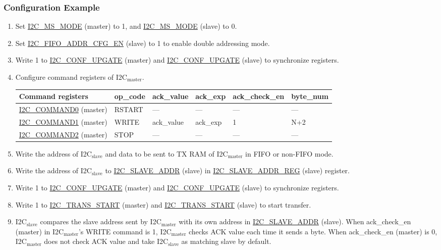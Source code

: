 \documentclass[main\_\_EN.tex]{subfiles}
\begin{document}
\subsubsection{Configuration Example}
\begin{enumerate}
\item Set \hyperref[fielddesc:I2CMSMODE]{I2C\_MS\_MODE} (master) to 1, and \hyperref[fielddesc:I2CMSMODE]{I2C\_MS\_MODE} (slave) to 0.
\item Set \hyperref[fielddesc:I2CFIFOADDRCFGEN]{I2C\_FIFO\_ADDR\_CFG\_EN} (slave) to 1 to enable double addressing mode.
\item Write 1 to \hyperref[fielddesc:I2CCONFUPGATE]{I2C\_CONF\_UPGATE} (master) and \hyperref[fielddesc:I2CCONFUPGATE]{I2C\_CONF\_UPGATE} (slave) to synchronize registers.
\item Configure command registers of I2C$_\text{master}$.
\begin{longtable}{ | p{4cm} | p{2cm} | p{2cm} | p{2cm} |p{2cm} | p{2cm} |}
\hline\rowcolor{lightgray}
Command registers& op\_code & ack\_value&ack\_exp&ack\_check\_en&byte\_num  \\ \hline
\hyperref[fielddesc:I2CCOMMAND0]{I2C\_COMMAND0} (master)& RSTART& ---&---&---&---  \\ \hline
\hyperref[fielddesc:I2CCOMMAND1]{I2C\_COMMAND1} (master)& WRITE& ack\_value&ack\_exp&1&N+2  \\ \hline
\hyperref[fielddesc:I2CCOMMAND2]{I2C\_COMMAND2} (master)& STOP& ---&---&---&---  \\ \hline
\end{longtable}
\item Write the address of I2C$_\text{slave}$ and data to be sent to TX RAM of I2C$_\text{master}$ in FIFO or non-FIFO mode.
\item Write the address of I2C$_\text{slave}$ to \hyperref[fielddesc:I2CSLAVEADDR]{I2C\_SLAVE\_ADDR} (slave) in \hyperref[regdesc:I2CSLAVEADDRREG]{I2C\_SLAVE\_ADDR\_REG} (slave) register.
\item Write 1 to \hyperref[fielddesc:I2CCONFUPGATE]{I2C\_CONF\_UPGATE} (master) and \hyperref[fielddesc:I2CCONFUPGATE]{I2C\_CONF\_UPGATE} (slave) to synchronize registers.
\item Write 1 to \hyperref[fielddesc:I2CTRANSSTART]{I2C\_TRANS\_START} (master) and \hyperref[fielddesc:I2CTRANSSTART]{I2C\_TRANS\_START} (slave) to start transfer.
\item I2C$_\text{slave}$ compares the slave address sent by I2C$_\text{master}$ with its own address in \hyperref[fielddesc:I2CSLAVEADDR]{I2C\_SLAVE\_ADDR} (slave). When ack\_check\_en (master) in I2C$_\text{master}$'s WRITE command is 1, I2C$_\text{master}$ checks ACK value each time it sends a byte. When ack\_check\_en (master) is 0, I2C$_\text{master}$ does not check ACK value and take I2C$_\text{slave}$ as matching slave by default.

\end{enumerate}
\end{document}
